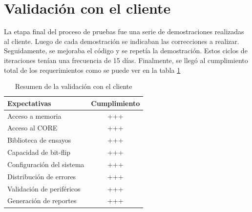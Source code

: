 \section{Validación con el cliente}
\label{sec:validacion}

La etapa final del proceso de pruebas fue una serie de demostraciones realizadas al cliente.
Luego de cada demostración se indicaban las correcciones a realizar.
Seguidamente, se mejoraba el código y se repetía la demostración.
Estos ciclos de iteraciones tenían una frecuencia de 15 días.
Finalmente, se llegó al cumplimiento total de los requerimientos como se puede ver en la tabla \ref{tab:validacion}

\begin{table}[h]
	\centering
	\caption[Resumen de la validación con el cliente]{Resumen de la validación con el cliente}

	\begin{tabular}{l c}    
		\toprule
        \textbf{Expectativas}     & \textbf{Cumplimiento} \\
		\midrule
		Acceso a memoria          & +++                   \\
		Acceso al CORE            & +++                   \\
		Biblioteca de ensayos     & +++                   \\		
		Capacidad de bit-flip     & +++                   \\
		Configuración del sistema & +++                   \\
		Distribución de errores   & +++                   \\
		Validación de periféricos & +++                   \\
        Generación de reportes    & +++                   \\
		\bottomrule
		\hline
	\end{tabular}
	\label{tab:validacion}
\end{table}
